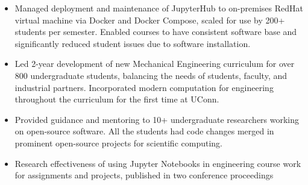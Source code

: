 \begin{itemize}
\item Managed deployment and maintenance of JupyterHub to on-premises RedHat virtual machine via Docker and Docker Compose, scaled for use by 200+ students per semester. Enabled courses to have consistent software base and significantly reduced student issues due to software installation.
\item Led 2-year development of new Mechanical Engineering curriculum for over 800 undergraduate students, balancing the needs of students, faculty, and industrial partners. Incorporated modern computation for engineering throughout the curriculum for the first time at UConn.
\item Provided guidance and mentoring to 10+ undergraduate researchers working on open-source software. All the students had code changes merged in prominent open-source projects for scientific computing.
\item Research effectiveness of using Jupyter Notebooks in engineering course work for assignments and projects, published in two conference proceedings
\end{itemize}
\sectionsep



